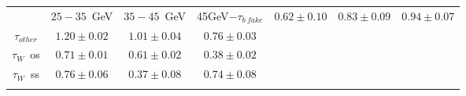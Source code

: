 \centering
\begin{tabular}{|c|c|c|c|} \toprule\toprule
 & $25-35$~GeV & $35-45$~GeV & 45GeV$-$$\tau_{b~fake}$ & $0.62\pm0.10$ & $0.83\pm0.09$ & $0.94\pm0.07$\\
$\tau_{other}$ & $1.20\pm0.02$ & $1.01\pm0.04$ & $0.76\pm0.03$\\
$\tau_{W}$~os & $0.71\pm0.01$ & $0.61\pm0.02$ & $0.38\pm0.02$\\
$\tau_{W}$~ss & $0.76\pm0.06$ & $0.37\pm0.08$ & $0.74\pm0.08$\\
\bottomrule\bottomrule\\
\end{tabular}
